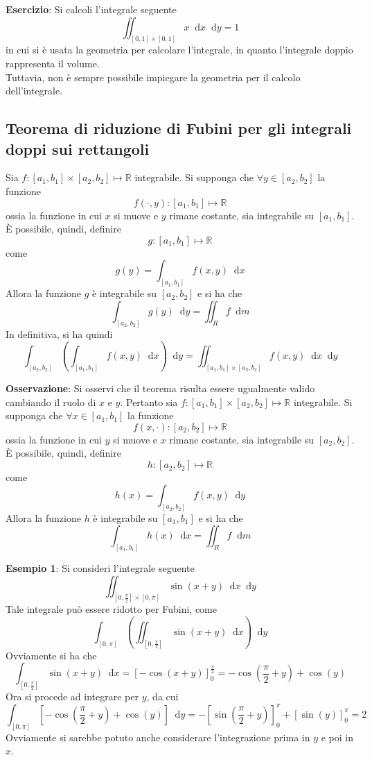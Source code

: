 \documentclass[a4paper]{extarticle}
\newcommand*\dif{\mathop{}\!\mathrm{d}}
\begin{document}
\vspace{2em}
\noindent
\textbf{Esercizio}: Si calcoli l'integrale seguente
\[\iint_{[0,1] \times [0,1]} x \dif x \dif y = 1\]
in cui si è usata la geometria per calcolare l'integrale, in quanto l'integrale doppio rappresenta il volume.\\
Tuttavia, non è sempre possibile impiegare la geometria per il calcolo dell'integrale.

\vspace{2em}
\noindent
\subsection{Teorema di riduzione di Fubini per gli integrali doppi sui rettangoli}
Sia $f : [a_1,b_1] \times [a_2,b_2] \longmapsto \mathbb{R}$ integrabile. Si supponga che $\forall y \in [a_2,b_2]$
la funzione
\[f(\cdot,y) : [a_1,b_1] \longmapsto \mathbb{R}\]
ossia la funzione in cui $x$ si muove e $y$ rimane costante, sia integrabile su $[a_1,b_1]$. È possibile, quindi, definire
\[g : [a_1,b_1] \longmapsto \mathbb{R}\]
come
\[g(y) = \int_{[a_1,b_1]} f(x,y) \dif x\]
Allora la funzione $g$ è integrabile su $[a_2,b_2]$ e si ha che
\[\int_{[a_2,b_2]} g(y) \dif y = \iint_R f \dif m\]
In definitiva, si ha quindi
\[\int_{[a_2,b_2]} \left(\int_{[a_1,b_1]} f(x,y) \dif x\right) \dif y = \iint_{[a_1,b_1] \times [a_2,b_2]} f(x,y) \dif x \dif y\]

\vspace{1em}
\noindent
\textbf{Osservazione}: Si osservi che il teorema risulta essere ugualmente valido cambiando il ruolo di $x$ e $y$. Pertanto sia $f : [a_1,b_1] \times [a_2,b_2] \longmapsto \mathbb{R}$ integrabile. Si supponga che $\forall x \in [a_1,b_1]$
la funzione
\[f(x,\cdot) : [a_2,b_2] \longmapsto \mathbb{R}\]
ossia la funzione in cui $y$ si muove e $x$ rimane costante, sia integrabile su $[a_2,b_2]$. È possibile, quindi, definire
\[h : [a_2,b_2] \longmapsto \mathbb{R}\]
come
\[h(x) = \int_{[a_2,b_2]} f(x,y) \dif y\]
Allora la funzione $h$ è integrabile su $[a_1,b_1]$ e si ha che
\[\int_{[a_1,b_1]} h(x) \dif x = \iint_R f \dif m\]

\vspace{2em}
\noindent
\textbf{Esempio 1}: Si consideri l'integrale seguente
\[\iint_{\left[0,\frac{\pi}{2}\right] \times \left[0,\pi\right]} \sin(x+y) \dif x \dif y\]
Tale integrale può essere ridotto per Fubini, come
\[\int_{\left[0,\pi\right]} \left(\iint_{\left[0,\frac{\pi}{2}\right]} \sin(x+y) \dif x \right) \dif y\]
Ovviamente si ha che
\[\int_{\left[0,\frac{\pi}{2}\right]} \sin(x+y) \dif x = \left[-\cos(x+y)\right]_0^{\frac{\pi}{2}} = - \cos\left(\frac{\pi}{2}+y\right) + \cos(y)\]
Ora si procede ad integrare per $y$, da cui
\[\int_{[0,\pi]} \left[- \cos\left(\frac{\pi}{2}+y\right) + \cos(y)\right] \dif y = -\left[\sin\left(\frac{\pi}{2}+y\right)\right]_0^\pi + \left[\sin(y)\right]_0^\pi = 2\]
Ovviamente si sarebbe potuto anche considerare l'integrazione prima in $y$ e poi in $x$.
\end{document}
